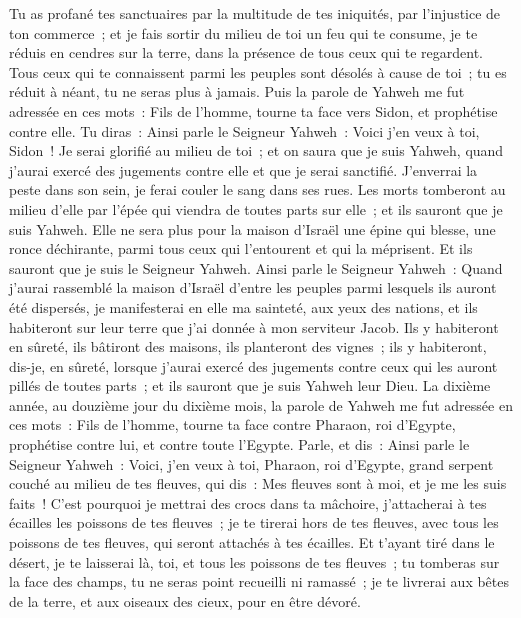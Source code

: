 \begin{multicols}{2}
Tu as profané tes sanctuaires par la multitude de tes iniquités, par l'injustice de ton commerce~; et je fais sortir du milieu de toi un feu qui te consume, je te réduis en cendres sur la terre, dans la présence de tous ceux qui te regardent.
Tous ceux qui te connaissent parmi les peuples sont désolés à cause de toi~; tu es réduit à néant, tu ne seras plus à jamais.
Puis la parole de Yahweh me fut adressée en ces mots~:
Fils de l'homme, tourne ta face vers Sidon, et prophétise contre elle.
Tu diras~: Ainsi parle le Seigneur Yahweh~: Voici j'en veux à toi, Sidon~! Je serai glorifié au milieu de toi~; et on saura que je suis Yahweh, quand j'aurai exercé des jugements contre elle et que je serai sanctifié.
J'enverrai la peste dans son sein, je ferai couler le sang dans ses rues. Les morts tomberont au milieu d'elle par l'épée qui viendra de toutes parts sur elle~; et ils sauront que je suis Yahweh.
Elle ne sera plus pour la maison d'Israël une épine qui blesse, une ronce déchirante, parmi tous ceux qui l'entourent et qui la méprisent. Et ils sauront que je suis le Seigneur Yahweh.
Ainsi parle le Seigneur Yahweh~: Quand j'aurai rassemblé la maison d'Israël d'entre les peuples parmi lesquels ils auront été dispersés, je manifesterai en elle ma sainteté, aux yeux des nations, et ils habiteront sur leur terre que j'ai donnée à mon serviteur Jacob.
Ils y habiteront en sûreté, ils bâtiront des maisons, ils planteront des vignes~; ils y habiteront, dis-je, en sûreté, lorsque j'aurai exercé des jugements contre ceux qui les auront pillés de toutes parts~; et ils sauront que je suis Yahweh leur Dieu.
\VerseOne{}La dixième année, au douzième jour du dixième mois, la parole de Yahweh me fut adressée en ces mots~:
Fils de l'homme, tourne ta face contre Pharaon, roi d'Egypte, prophétise contre lui, et contre toute l'Egypte.
Parle, et dis~: Ainsi parle le Seigneur Yahweh~: Voici, j'en veux à toi, Pharaon, roi d'Egypte, grand serpent couché au milieu de tes fleuves, qui dis~: Mes fleuves sont à moi, et je me les suis faits~!
C'est pourquoi je mettrai des crocs dans ta mâchoire, j'attacherai à tes écailles les poissons de tes fleuves~; je te tirerai hors de tes fleuves, avec tous les poissons de tes fleuves, qui seront attachés à tes écailles.
Et t'ayant tiré dans le désert, je te laisserai là, toi, et tous les poissons de tes fleuves~; tu tomberas sur la face des champs, tu ne seras point recueilli ni ramassé~; je te livrerai aux bêtes de la terre, et aux oiseaux des cieux, pour en être dévoré.

\end{multicols}
